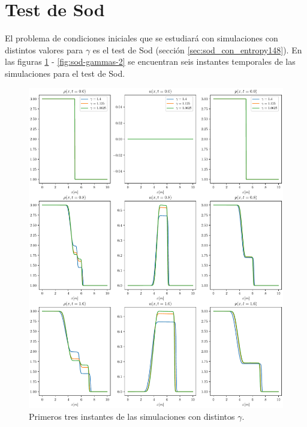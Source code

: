 \section{Test de Sod}
El problema de condiciones iniciales que se estudiará con simulaciones con distintos valores para $\gamma$ es el test de Sod (sección \ref{sec:sod_con_entropy148}). En las figuras \ref{fig:sod-gammas-1} - \ref{fig:sod-gammas-2} se encuentran seis instantes temporales de las simulaciones para el test de Sod.
\begin{figure}[H]
	\includegraphics[width=\linewidth]{../euler1D/experimentos/graficas_sod/1.pdf}
	\caption{Primeros tres instantes de las simulaciones con distintos $\gamma$.}
	\label{fig:sod-gammas-1}
\end{figure}
